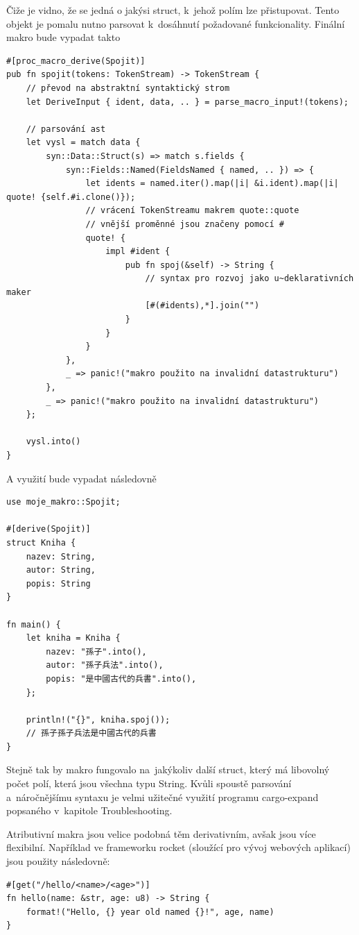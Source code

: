 \documentclass[a4paper, 12pt]{article} %
\begin{document}
            Čiže je vidno, že se jedná o jakýsi struct, k~jehož polím lze přistupovat. Tento objekt je pomalu nutno parsovat k~dosáhnutí požadované funkcionality. Finální makro bude vypadat takto
            \begin{verbatim}
#[proc_macro_derive(Spojit)]
pub fn spojit(tokens: TokenStream) -> TokenStream {
    // převod na abstraktní syntaktický strom
    let DeriveInput { ident, data, .. } = parse_macro_input!(tokens);

    // parsování ast
    let vysl = match data {
        syn::Data::Struct(s) => match s.fields {
            syn::Fields::Named(FieldsNamed { named, .. }) => {
                let idents = named.iter().map(|i| &i.ident).map(|i| quote! {self.#i.clone()});
                // vrácení TokenStreamu makrem quote::quote
                // vnější proměnné jsou značeny pomocí #
                quote! {
                    impl #ident {
                        pub fn spoj(&self) -> String {
                            // syntax pro rozvoj jako u~deklarativních maker
                            [#(#idents),*].join("")
                        }
                    }
                }
            },
            _ => panic!("makro použito na invalidní datastrukturu")
        },
        _ => panic!("makro použito na invalidní datastrukturu")
    };

    vysl.into()
}
            \end{verbatim}
            
            A využití bude vypadat následovně
            \begin{verbatim}
use moje_makro::Spojit;

#[derive(Spojit)]
struct Kniha {
    nazev: String,
    autor: String,
    popis: String
}

fn main() {
    let kniha = Kniha {
        nazev: "孫子".into(),
        autor: "孫子兵法".into(),
        popis: "是中國古代的兵書".into(),
    };

    println!("{}", kniha.spoj());
    // 孫子孫子兵法是中國古代的兵書
}
            \end{verbatim}
            \cite{atrib_makro}
            
            Stejně tak by makro fungovalo na~jakýkoliv další struct, který má libovolný počet polí, která jsou všechna typu String. Kvůli spoustě parsování a~náročnějšímu syntaxu je velmi užitečné využití programu cargo-expand popsaného v~kapitole Troubleshooting.
            
            Atributivní makra jsou velice podobná těm derivativním, avšak jsou více flexibilní. Například ve frameworku rocket (sloužící pro vývoj webových aplikací) jsou použity následovně: 
            \begin{verbatim}
#[get("/hello/<name>/<age>")]
fn hello(name: &str, age: u8) -> String {
    format!("Hello, {} year old named {}!", age, name)
}
            \end{verbatim}
            \cite{rocket}
            
\end{document}
